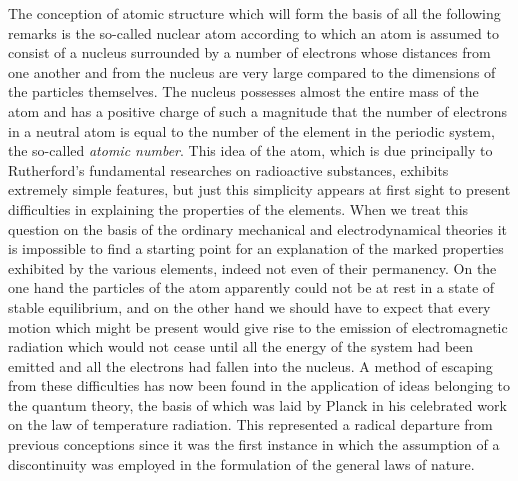  The conception of atomic structure which
will form the basis of all the following remarks is the so-called
nuclear atom according to which an atom is assumed to consist of
a nucleus surrounded by a number of electrons whose distances
from one another and from the nucleus are very large compared
to the dimensions of the particles themselves. The nucleus
possesses almost the entire mass of the atom and has a positive
charge of such a magnitude that the number of electrons in a
neutral atom is equal to the number of the element in the periodic
system, the so-called \emph{atomic number}. This idea of the atom, which
is due principally to Rutherford's fundamental researches on radioactive
substances, exhibits extremely simple features, but just this
simplicity appears at first sight to present difficulties in explaining
the properties of the elements. When we treat this question on
the basis of the ordinary mechanical and electrodynamical theories
it is impossible to find a starting point for an explanation of the
marked properties exhibited by the various elements, indeed not
even of their permanency. On the one hand the particles of the
atom apparently could not be at rest in a state of stable equilibrium,
and on the other hand we should have to expect that every motion
which might be present would give rise to the emission of electromagnetic
radiation which would not cease until all the energy of
the system had been emitted and all the electrons had fallen into
the nucleus. A method of escaping from these difficulties has now
been found in the application of ideas belonging to the quantum
theory, the basis of which was laid by Planck in his celebrated
work on the law of temperature radiation. This represented a
radical departure from previous conceptions since it was the first
instance in which the assumption of a discontinuity was employed
in the formulation of the general laws of nature.

